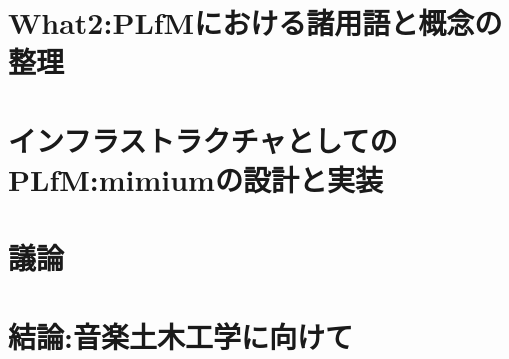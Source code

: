 \documentclass[dvipdfmx,a4paper,openany]{jsbook}
\begin{document}
\chapter{What2:PLfMにおける諸用語と概念の整理}


\chapter{インフラストラクチャとしてのPLfM:mimiumの設計と実装}


\chapter{議論}


\chapter{結論:音楽土木工学に向けて}


\printbibliography[title = 参考文献]
\end{document}
